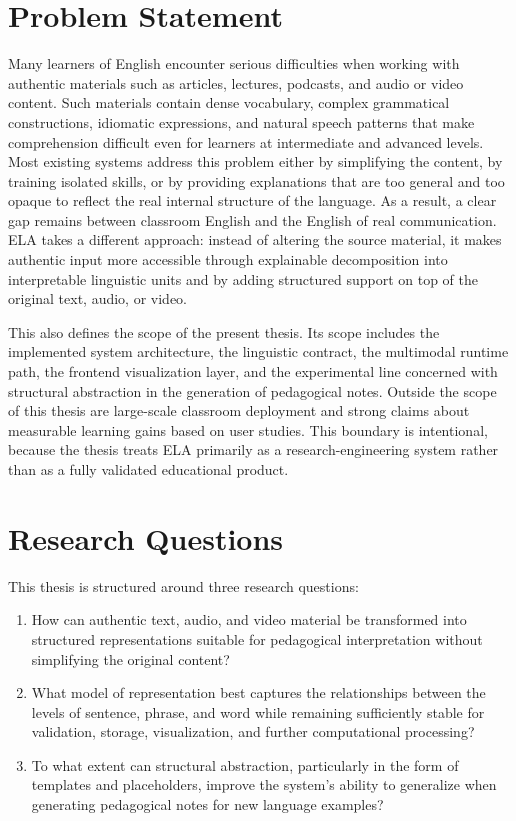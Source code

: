 \documentclass[12pt,a4paper,oneside]{report}
\begin{document}
\section{Problem Statement}
Many learners of English encounter serious difficulties when working with authentic materials such as articles, lectures, podcasts, and audio or video content. Such materials contain dense vocabulary, complex grammatical constructions, idiomatic expressions, and natural speech patterns that make comprehension difficult even for learners at intermediate and advanced levels. Most existing systems address this problem either by simplifying the content, by training isolated skills, or by providing explanations that are too general and too opaque to reflect the real internal structure of the language. As a result, a clear gap remains between classroom English and the English of real communication. ELA takes a different approach: instead of altering the source material, it makes authentic input more accessible through explainable decomposition into interpretable linguistic units and by adding structured support on top of the original text, audio, or video.

This also defines the scope of the present thesis. Its scope includes the implemented system architecture, the linguistic contract, the multimodal runtime path, the frontend visualization layer, and the experimental line concerned with structural abstraction in the generation of pedagogical notes. Outside the scope of this thesis are large-scale classroom deployment and strong claims about measurable learning gains based on user studies. This boundary is intentional, because the thesis treats ELA primarily as a research-engineering system rather than as a fully validated educational product.

\section{Research Questions}
This thesis is structured around three research questions:
\begin{enumerate}
  \item How can authentic text, audio, and video material be transformed into structured representations suitable for pedagogical interpretation without simplifying the original content?
  \item What model of representation best captures the relationships between the levels of sentence, phrase, and word while remaining sufficiently stable for validation, storage, visualization, and further computational processing?
  \item To what extent can structural abstraction, particularly in the form of templates and placeholders, improve the system's ability to generalize when generating pedagogical notes for new language examples?
\end{enumerate}
\end{document}
